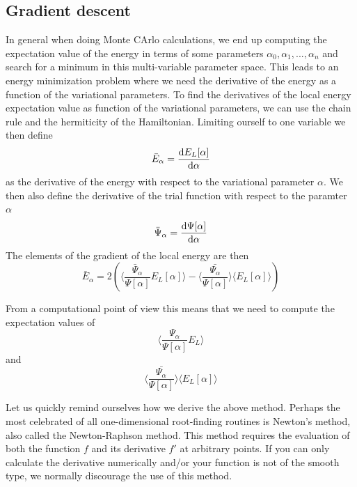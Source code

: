 \documentclass[a4paper, 10pt, english]{revtex4-2} %
\begin{document}
        
    \subsection*{Gradient descent}
        In general when doing Monte CArlo calculations, we end up computing the expectation value of the energy in terms of some parameters $\alpha_0, \alpha_1,..., \alpha_n$ and search for a minimum in this multi-variable parameter space.
        This leads to an energy minimization problem where we need the derivative of the energy as a function of the variational parameters.
        To find the derivatives of the local energy expectation value as function of the variational parameters, we can use the chain rule and the hermiticity of the Hamiltonian.
        Limiting ourself to one variable we then define
        \begin{equation}
                \bar{E}_\alpha
            =   \derivative{E_L[\alpha]}{\alpha}
        \end{equation}
        as the derivative of the energy with respect to the variational parameter $\alpha$. 
        We then  also define the derivative of the trial function with respect to the paramter $\alpha$
        \begin{equation}
                \bar{\Psi}_\alpha
            =   \derivative{\Psi[\alpha]}{\alpha}
        \end{equation}
        The elements of the gradient of the local energy are then
        \begin{equation}
                \bar{E}_\alpha
            =   2\left(\langle\frac{\bar{\Psi}_\alpha}{\Psi[\alpha]}E_L[\alpha]\rangle - \langle\frac{\bar{\Psi_\alpha}}{\Psi[\alpha]}\rangle\langle E_L[\alpha]\rangle\right)
        \end{equation}

        From a computational point of view this means that we need to compute the expectation values of
        \begin{equation}
            \langle \frac{\Psi_\alpha}{\Psi[\alpha]} E_L \rangle
        \end{equation}
        and
        \begin{equation}
            \langle\frac{\bar{\Psi_\alpha}}{\Psi[\alpha]}\rangle\langle E_L[\alpha]\rangle
        \end{equation}


        Let us quickly remind ourselves how we derive the above method.
        Perhaps the most celebrated of all one-dimensional root-finding routines is Newton's method, also called the Newton-Raphson method. 
        This method requires the evaluation of both the function $f$ and its derivative $f'$ at arbitrary points. 
        If you can only calculate the derivative numerically and/or your function is not of the smooth type, we normally discourage the use of this method.
\end{document}
